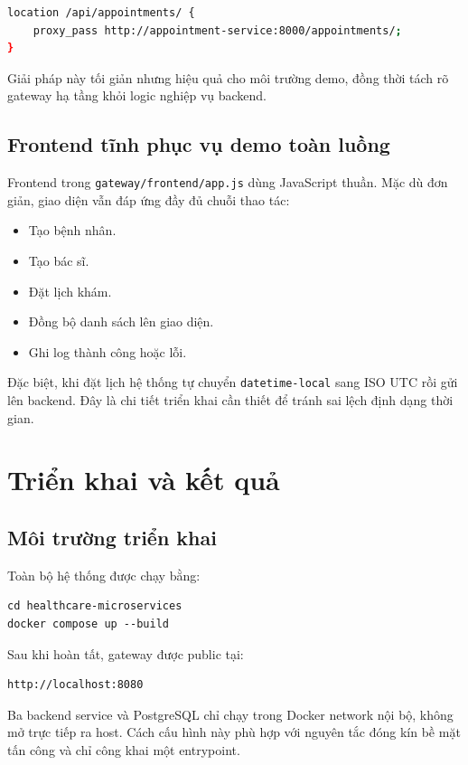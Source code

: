 \documentclass[12pt,a4paper]{article}
\begin{document}
\begin{lstlisting}[style=code,language=bash,caption={Ý tưởng routing tại Nginx gateway}]
location /api/appointments/ {
    proxy_pass http://appointment-service:8000/appointments/;
}
\end{lstlisting}

Giải pháp này tối giản nhưng hiệu quả cho môi trường demo, đồng thời tách rõ gateway hạ tầng khỏi logic nghiệp vụ backend.

\subsection{Frontend tĩnh phục vụ demo toàn luồng}
Frontend trong \texttt{gateway/frontend/app.js} dùng JavaScript thuần. Mặc dù đơn giản, giao diện vẫn đáp ứng đầy đủ chuỗi thao tác:
\begin{itemize}[leftmargin=1.5em]
  \item Tạo bệnh nhân.
  \item Tạo bác sĩ.
  \item Đặt lịch khám.
  \item Đồng bộ danh sách lên giao diện.
  \item Ghi log thành công hoặc lỗi.
\end{itemize}

Đặc biệt, khi đặt lịch hệ thống tự chuyển \texttt{datetime-local} sang ISO UTC rồi gửi lên backend. Đây là chi tiết triển khai cần thiết để tránh sai lệch định dạng thời gian.

\section{Triển khai và kết quả}
\subsection{Môi trường triển khai}
Toàn bộ hệ thống được chạy bằng:
\begin{lstlisting}[style=code,basicstyle=\ttfamily\small]
cd healthcare-microservices
docker compose up --build
\end{lstlisting}

Sau khi hoàn tất, gateway được public tại:
\begin{lstlisting}[style=code,basicstyle=\ttfamily\small]
http://localhost:8080
\end{lstlisting}

Ba backend service và PostgreSQL chỉ chạy trong Docker network nội bộ, không mở trực tiếp ra host. Cách cấu hình này phù hợp với nguyên tắc đóng kín bề mặt tấn công và chỉ công khai một entrypoint.
\end{document}
